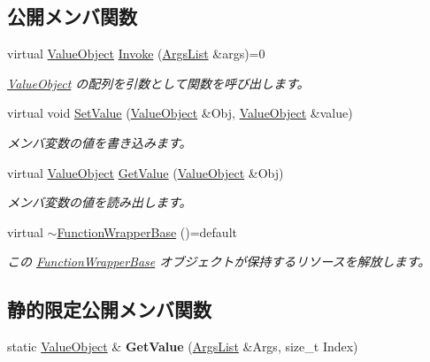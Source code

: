 \subsection*{公開メンバ関数}
\begin{DoxyCompactItemize}
\item 
virtual \hyperlink{class_reflection_1_1_value_object}{Value\+Object} \hyperlink{class_reflection_1_1_function_wrapper_base_a23b2aa7c02ba4daf611a9a8fa52b1f8d}{Invoke} (\hyperlink{_reflector_helper_8hpp_a83512919cd42ea73553f4d173e7ace4c}{Args\+List} \&args)=0
\begin{DoxyCompactList}\small\item\em \hyperlink{class_reflection_1_1_value_object}{Value\+Object} の配列を引数として関数を呼び出します。\end{DoxyCompactList}\item 
virtual void \hyperlink{class_reflection_1_1_function_wrapper_base_a36995d6466e10a377669082eb9e3daae}{Set\+Value} (\hyperlink{class_reflection_1_1_value_object}{Value\+Object} \&Obj, \hyperlink{class_reflection_1_1_value_object}{Value\+Object} \&value)
\begin{DoxyCompactList}\small\item\em メンバ変数の値を書き込みます。\end{DoxyCompactList}\item 
virtual \hyperlink{class_reflection_1_1_value_object}{Value\+Object} \hyperlink{class_reflection_1_1_function_wrapper_base_ac8d92623cf7e6c328fed80b918cb857a}{Get\+Value} (\hyperlink{class_reflection_1_1_value_object}{Value\+Object} \&Obj)
\begin{DoxyCompactList}\small\item\em メンバ変数の値を読み出します。\end{DoxyCompactList}\item 
virtual \hyperlink{class_reflection_1_1_function_wrapper_base_a2ab28e5876c05c005275ec2a71b6e794}{$\sim$\+Function\+Wrapper\+Base} ()=default
\begin{DoxyCompactList}\small\item\em この \hyperlink{class_reflection_1_1_function_wrapper_base}{Function\+Wrapper\+Base} オブジェクトが保持するリソースを解放します。\end{DoxyCompactList}\end{DoxyCompactItemize}
\subsection*{静的限定公開メンバ関数}
\begin{DoxyCompactItemize}
\item 
static \hyperlink{class_reflection_1_1_value_object}{Value\+Object} \& {\bfseries Get\+Value} (\hyperlink{_reflector_helper_8hpp_a83512919cd42ea73553f4d173e7ace4c}{Args\+List} \&Args, size\+\_\+t Index)\hypertarget{class_reflection_1_1_function_wrapper_base_a970bce51e2d27d81e99926e622487081}{}\label{class_reflection_1_1_function_wrapper_base_a970bce51e2d27d81e99926e622487081}

\end{DoxyCompactItemize}


